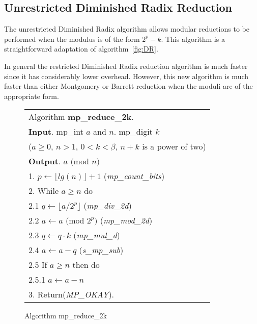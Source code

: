\documentclass[b5paper]{book}
\begin{document}
\subsection{Unrestricted Diminished Radix Reduction}
The unrestricted Diminished Radix algorithm allows modular reductions to be performed when the modulus is of the form $2^p - k$.  This algorithm
is a straightforward adaptation of algorithm~\ref{fig:DR}.

In general the restricted Diminished Radix reduction algorithm is much faster since it has considerably lower overhead.  However, this new
algorithm is much faster than either Montgomery or Barrett reduction when the moduli are of the appropriate form.

\begin{figure}[!here]
\begin{small}
\begin{center}
\begin{tabular}{l}
\hline Algorithm \textbf{mp\_reduce\_2k}. \\
\textbf{Input}.   mp\_int $a$ and $n$.  mp\_digit $k$  \\
\hspace{11.5mm}($a \ge 0$, $n > 1$, $0 < k < \beta$, $n + k$ is a power of two) \\
\textbf{Output}.  $a \mbox{ (mod }n\mbox{)}$ \\
\hline
1.  $p \leftarrow \lfloor lg(n) \rfloor + 1$  (\textit{mp\_count\_bits}) \\
2.  While $a \ge n$ do \\
\hspace{3mm}2.1  $q \leftarrow \lfloor a / 2^p \rfloor$ (\textit{mp\_div\_2d}) \\
\hspace{3mm}2.2  $a \leftarrow a \mbox{ (mod }2^p\mbox{)}$ (\textit{mp\_mod\_2d}) \\
\hspace{3mm}2.3  $q \leftarrow q \cdot k$ (\textit{mp\_mul\_d}) \\
\hspace{3mm}2.4  $a \leftarrow a - q$ (\textit{s\_mp\_sub}) \\
\hspace{3mm}2.5  If $a \ge n$ then do \\
\hspace{6mm}2.5.1  $a \leftarrow a - n$ \\
3.  Return(\textit{MP\_OKAY}). \\
\hline
\end{tabular}
\end{center}
\end{small}
\caption{Algorithm mp\_reduce\_2k}
\end{figure}
\end{document}
